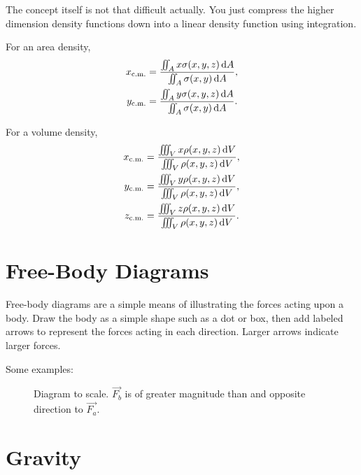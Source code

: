 The concept itself is not that difficult actually.
You just compress the higher dimension density functions
down into a linear density function using integration.

For an area density,
\begin{equation}
    \begin{aligned}
        x_\mathrm{c.m.} &=
        \frac{\iint_A x \sigma(x, y, z) \odif{A}}
        {\iint_A \sigma(x, y) \odif{A}}, \\
        y_\mathrm{c.m.} &=
        \frac{\iint_A y \sigma(x, y, z) \odif{A}}
        {\iint_A \sigma(x, y) \odif{A}}.
    \end{aligned}
\end{equation}

For a volume density,
\begin{equation}
    \begin{aligned}
        x_\mathrm{c.m.} &=
        \frac{\iiint_V x \rho(x, y, z) \odif{V}}
        {\iiint_V \rho(x, y, z) \odif{V}}, \\
        y_\mathrm{c.m.} &=
        \frac{\iiint_V y \rho(x, y, z) \odif{V}}
        {\iiint_V \rho(x, y, z) \odif{V}}, \\
        z_\mathrm{c.m.} &=
        \frac{\iiint_V z \rho(x, y, z) \odif{V}}
        {\iiint_V \rho(x, y, z) \odif{V}}.
    \end{aligned}
\end{equation}

\section{Free-Body Diagrams} \label{sec:free-body-diagrams}

Free-body diagrams are a simple means of illustrating the forces
acting upon a body.
Draw the body as a simple shape such as a dot or box,
then add labeled arrows to represent the forces acting in each direction.
Larger arrows indicate larger forces.

Some examples:
\begin{figure}[ht]
    \centering
    
    \caption{
        Diagram to scale.
        \(\vec{F_b}\) is of greater magnitude than and opposite
        direction to \(\vec{F_a}\).
    }
\end{figure}

\section{Gravity}

